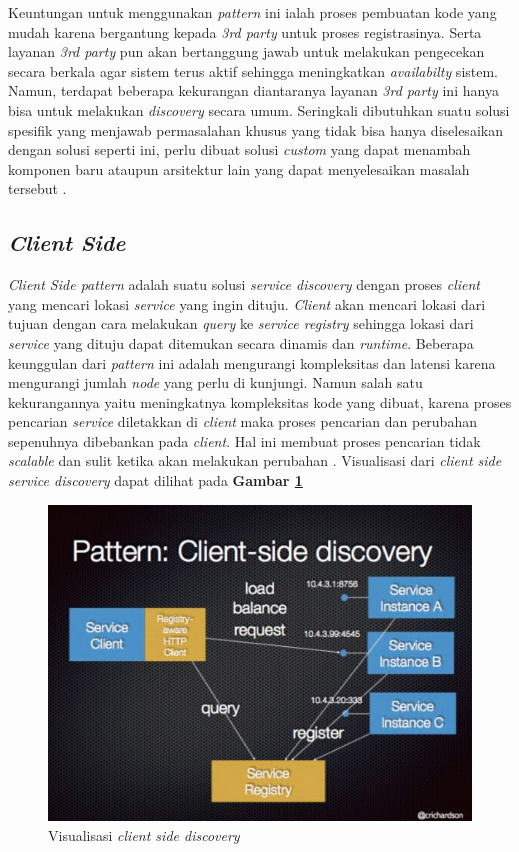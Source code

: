 Keuntungan untuk menggunakan \textit{pattern} ini ialah proses pembuatan kode yang mudah karena bergantung kepada \textit{3rd party} untuk proses registrasinya. Serta layanan \textit{3rd party} pun akan bertanggung jawab untuk melakukan pengecekan secara berkala agar sistem terus aktif sehingga meningkatkan \textit{availabilty} sistem. Namun, terdapat beberapa kekurangan diantaranya layanan \textit{3rd party} ini hanya bisa untuk melakukan \textit{discovery} secara umum. Seringkali dibutuhkan suatu solusi spesifik yang menjawab permasalahan khusus yang tidak bisa hanya diselesaikan dengan solusi seperti ini, perlu dibuat solusi \textit{custom} yang dapat menambah komponen baru ataupun arsitektur lain yang dapat menyelesaikan masalah tersebut \parencite{3rdpartyintegration}.

\subsection{\textit{Client Side}}
\textit{Client Side pattern} adalah suatu solusi \textit{service discovery} dengan proses \textit{client} yang mencari lokasi \textit{service} yang ingin dituju. \textit{Client} akan mencari lokasi dari tujuan dengan cara melakukan \textit{query} ke \textit{service registry} sehingga lokasi dari \textit{service} yang dituju dapat ditemukan secara dinamis dan \textit{runtime}. Beberapa keunggulan dari \textit{pattern} ini adalah mengurangi kompleksitas dan latensi karena mengurangi jumlah \textit{node} yang perlu di kunjungi. Namun salah satu kekurangannya yaitu meningkatnya kompleksitas kode yang dibuat, karena proses pencarian \textit{service} diletakkan di \textit{client} maka proses pencarian dan perubahan sepenuhnya dibebankan pada \textit{client}. Hal ini membuat proses pencarian tidak \textit{scalable} dan sulit ketika akan melakukan perubahan \parencite{clientsidediscovery}. Visualisasi dari \textit{client side service discovery} dapat dilihat pada \textbf{Gambar \ref{fig:client-side-discovery}}

\begin{figure}[h]
  \centering
  \includegraphics[width=1\textwidth]{resources/chapter-2/client-side-discovery.jpg}
  \caption{Visualisasi \textit{client side discovery} \parencite{clientsidediscovery} }
  \label{fig:client-side-discovery}
\end{figure}

